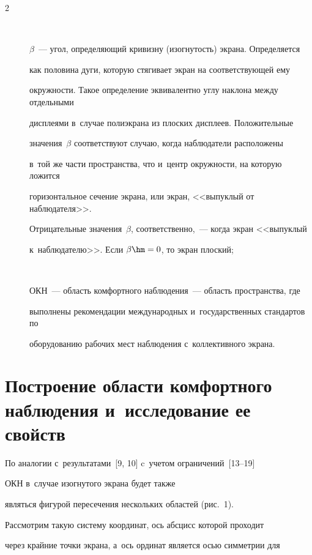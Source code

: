 \begin{multicols}{2}
\begin{description}
\item[\,]

$\beta$~--- угол, определяющий кривизну (изогнутость) экрана. Определяется

как половина дуги, которую стягивает экран на соответствующей ему

окружности. Такое определение эквивалентно углу наклона между отдельными

дисплеями в~случае полиэкрана из плоских дисплеев. Положительные

значения~$\beta$ соответствуют случаю, когда наблюдатели расположены

в~той же части пространства, что и~центр окружности, на которую ложится

горизонтальное сечение экрана, или экран, <<выпуклый от наблюдателя>>.

Отрицательные значения~$\beta$, соответственно,~--- когда экран <<выпуклый

к~наблюдателю>>. Если $\beta\hm=0$, то экран плоский;

\item[\,]

{ОКН}~--- область комфортного наблюдения~--- область пространства, где

выполнены рекомендации международных и~государственных стандартов по

оборудованию рабочих мест наблюдения с~коллективного экрана.

\end{description}



\section{Построение области комфортного наблюдения и~исследование ее свойств}





    По аналогии с~результатами~[9, 10] c~учетом ограничений~[13--19]

ОКН в~случае изогнутого экрана будет также

являться фигурой пересечения нескольких областей (рис.~1).







     Рассмотрим такую систему координат, ось абсцисс которой проходит

через крайние точки экрана, а~ось ординат является осью симметрии для


\end{multicols}
